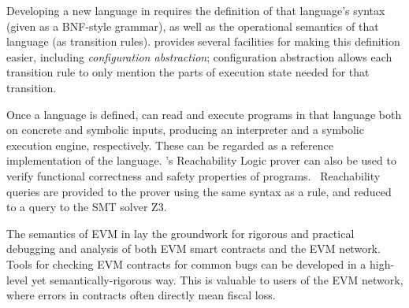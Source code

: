 Developing a new language in \K{} requires the definition of that language's
syntax (given as a BNF-style grammar), as well as the operational semantics of
that language (as transition rules). \K{} provides several facilities for making
this definition easier, including \textit{configuration abstraction};
configuration abstraction allows each transition rule to only mention the parts
of execution state needed for that transition.

Once a language is defined, \K{} can read and execute programs in that language
both on concrete and symbolic inputs, producing an interpreter and a symbolic
execution engine, respectively. These can be regarded as a reference
implementation of the language. \K{}'s Reachability Logic prover can also be used
to verify functional correctness and safety properties of
programs.~\cite{stefanescu-ciobaca-mereuta-moore-serbanuta-rosu-2014-rta}
Reachability queries are provided to the prover using the same syntax as a \K{}
rule, and reduced to a query to the SMT solver Z3.~\cite{de2008z3}

The semantics of EVM in \K{} lay the groundwork for rigorous and practical
debugging and analysis of both EVM smart contracts and the EVM network. Tools
for checking EVM contracts for common bugs can be developed in a high-level yet
semantically-rigorous way. This is valuable to users of the EVM network, where
errors in contracts often directly mean fiscal loss.
